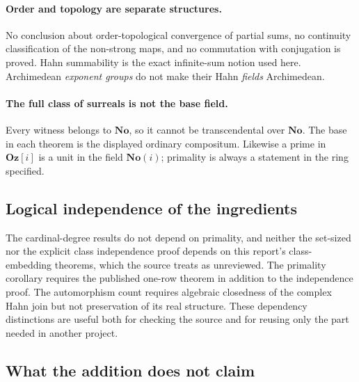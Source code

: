 \documentclass[11pt,letterpaper]{article}
\theoremstyle{definition}
\theoremstyle{remark}
\newcommand{\No}{\mathbf{No}}
\newcommand{\Oz}{\mathbf{Oz}}
\numberwithin{equation}{section}
\begin{document}
\paragraph{Order and topology are separate structures.}
No conclusion about order-topological convergence of partial sums, no
continuity classification of the non-strong maps, and no commutation
with conjugation is proved. Hahn summability is the exact infinite-sum
notion used here. Archimedean \emph{exponent groups} do not make their
Hahn \emph{fields} Archimedean.

\paragraph{The full class of surreals is not the base field.}
Every witness belongs to $\No$, so it cannot be transcendental over
$\No$. The base in each theorem is the displayed ordinary compositum.
Likewise a prime in $\Oz[i]$ is a unit in the field $\No(i)$; primality
is always a statement in the ring specified.

\subsection{Logical independence of the ingredients}

The cardinal-degree results do not depend on primality, and neither the
set-sized nor the explicit class independence proof depends on this
report's class-embedding theorems, which the source treats as unreviewed.
The primality corollary requires the published one-row theorem in addition
to the independence proof. The automorphism count requires algebraic
closedness of the complex Hahn join but not preservation of its real
structure. These dependency distinctions are useful both for checking the
source and for reusing only the part needed in another project.

\subsection{What the addition does not claim}\label{isc:hj:sub:nonclaims}
\end{document}
